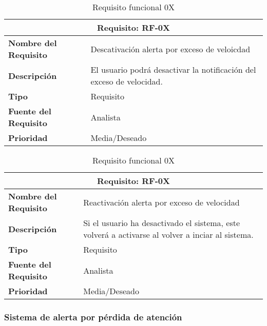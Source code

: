 \begin{table}[H]
\begin{center}
\begin{tabular}{p{} p{7cm}}
\multicolumn{2}{c}{\textbf{Requisito: RF-0X} } \\
\hline \hline
\textbf{Nombre del Requisito} & Descativación alerta por exceso de veloicdad \\
\hline
\textbf{Descripción} & El usuario podrá desactivar la notificación del exceso de velocidad. \\
\hline
\textbf{Tipo} & Requisito  \\
\hline
\textbf{Fuente del Requisito} & Analista  \\
\hline
\textbf{Prioridad} & Media/Deseado  \\ \hline
\end{tabular}
\caption{Requisito funcional 0X}
\label{tab:personal}
\end{center}
\end{table}

\begin{table}[H]
\begin{center}
\begin{tabular}{p{} p{7cm}}
\multicolumn{2}{c}{\textbf{Requisito: RF-0X} } \\
\hline \hline
\textbf{Nombre del Requisito} & Reactivación alerta por exceso de  velocidad \\
\hline
\textbf{Descripción} & Si el usuario ha desactivado el sistema, este volverá a activarse al volver a inciar al sistema. \\
\hline
\textbf{Tipo} & Requisito  \\
\hline
\textbf{Fuente del Requisito} & Analista  \\
\hline
\textbf{Prioridad} & Media/Deseado  \\ \hline
\end{tabular}
\caption{Requisito funcional 0X}
\label{tab:personal}
\end{center}
\end{table}


\subsubsection{Sistema de alerta por pérdida de atención}

